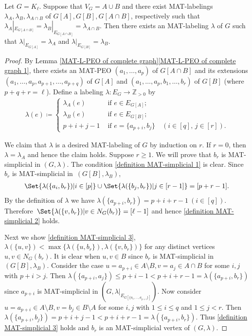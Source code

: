 \begin{lemma}\label{merge}
Let $ G = K_{\ell} $. 
Suppose that $ V_{G} = A \cup B $ and there exist MAT-labelings $ \lambda_{A}, \lambda_{B}, \lambda_{A \cap B} $ of $ G[A], G[B], G[A\cap B] $, respectively such that $ \lambda_{A}|_{E_{G[A\cap B]}} = \lambda_{B}|_{E_{G[A\cap B]}} = \lambda_{A \cap B} $. 
Then there exists an MAT-labeling $ \lambda $ of $ G $ such that $ \lambda|_{E_{G[A]}} = \lambda_{A} $ and $ \lambda|_{E_{G[B]}} = \lambda_{B} $. 
\end{lemma}
\begin{proof}
By Lemma \ref{MAT-L-PEO of complete graph}\ref{MAT-L-PEO of complete graph 1}, there exists an MAT-PEO $ (a_{1}, \dots, a_{p}) $ of $ G[A \cap B] $ and its extensions $ (a_{1}, \dots, a_{p}, a_{p+1}, \dots, a_{p+q}) $ of $ G[A] $ and $ (a_{1}, \dots, a_{p}, b_{1}, \dots, b_{r}) $ of $ G[B] $ (where $p+q+r=\ell$). 
Define a labeling $ \lambda \colon E_{G} \to \mathbb{Z}_{>0} $ by 
\begin{align*}
\lambda(e) \coloneqq \begin{cases}
\lambda_{A}(e) & \text{ if } e \in E_{G[A]}; \\
\lambda_{B}(e) & \text{ if } e \in E_{G[B]}; \\
p + i + j - 1 & \text{ if } e = \{a_{p+i}, b_{j}\} \quad (i \in [q], \,  j \in[  r]). 
\end{cases}
\end{align*}

We claim that $ \lambda $ is a desired MAT-labeling of $ G $ by induction on $ r $. 
If $ r = 0 $, then $ \lambda = \lambda_{A} $ and hence the claim holds. 
Suppose $ r \geq 1 $. 
We will prove that $ b_{r} $ is MAT-simplicial in $ (G, \lambda) $. 
The condition \ref{definition MAT-simplicial 1} is clear. 
Since $ b_{r} $ is MAT-simplicial in~$ (G[B], \lambda_{B}) $, 
\begin{align*}
\Set{\lambda(\{a_{i}, b_{r}\}) | i \in [p ] } \cup \Set{\lambda(\{b_{j}, b_{r}\}) | j \in[  r-1]} =[ p+r-1]. 
\end{align*}
By the definition of $ \lambda $ we have $ \lambda(\{a_{p+i}, b_{r}\}) = p+i+r-1 \ (i \in [q]) $. 
Therefore~$ \Set{\lambda(\{v,b_{r}\}) | v \in N_{G}(b_{r})} = [\ell - 1] $ and hence \ref{definition MAT-simplicial 2} holds. 

Next we show \ref{definition MAT-simplicial 3}, \ie  $ \lambda(\{u,v\}) < \max\{\lambda(\{u,b_{r}\}), \lambda(\{v,b_{r}\})\} $ for any distinct vertices $ u,v \in N_{G}(b_{r}) $. 
It is clear when $ u,v \in B $ since $ b_{r} $ is MAT-simplicial in~$ (G[B], \lambda_{B}) $. 
Consider the case $ u=a_{p+i} \in A\setminus B, v=a_{j} \in A \cap B$ for some $ i,j $ with $ p+i > j $. 
Then $ \lambda(\{a_{p+i}, a_{j}\}) \leq p+i-1 < p+i+r-1 = \lambda(\{a_{p+i}, b_{r}\}) $ since $ a_{p+i} $ is MAT-simplicial in $ (G, \lambda|_{E_{G[\{a_{1}, \dots, a_{p+i}\}]}}) $. 
Now consider $ u=a_{p+i} \in A\setminus B, v = b_{j} \in B\setminus A $ for some $ i,j $ with $ 1 \leq i \leq q $ and $ 1 \leq j < r $. 
Then $ \lambda(\{a_{p+i}, b_{j}\}) = p+i+j-1 < p+i+r-1 = \lambda(\{a_{p+i}, b_{r}\}) $. 
Thus \ref{definition MAT-simplicial 3} holds and $ b_{r} $ is an MAT-simplicial vertex of $ (G, \lambda) $. 


\end{proof}
